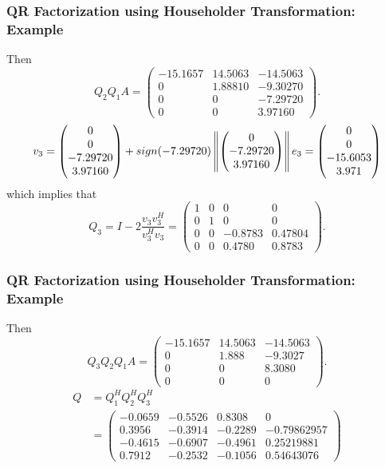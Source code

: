 \documentclass{beamer}
\begin{document}
\begin{frame}\frametitle{QR Factorization using Householder Transformation: Example}
	Then
	\[
		Q_2 Q_1A = 
			\begin{pmatrix}
				-15.1657 & 14.5063 & -14.5063 \\
				0 & 1.88810 & -9.30270 \\
				0 & 0 & -7.29720 \\
				0 & 0 & 3.97160		
			\end{pmatrix}.
	\]
	\[
		v_3 = 
			\begin{pmatrix} 
				0 \\ 0\\-7.29720\\3.97160
			\end{pmatrix} 
			+ sign(-7.29720)
				\left\|
					\begin{pmatrix} 
						0 \\-7.29720\\3.97160
					\end{pmatrix}
				\right\| e_3 
			= \begin{pmatrix} 
				0 \\0 \\ -15.6053 \\3.971
			  \end{pmatrix}
	\]
	which implies that
	\[
		Q_3= I - 2\frac{v_3v_3^H}{v_3^Hv_3}
			= \begin{pmatrix}
				1 & 0 & 0 & 0 \\
				0 & 1 & 0 & 0\\
				0 & 0 & -0.8783 & 0.47804\\
				0 & 0 & 0.4780 & 0.8783 
 			  \end{pmatrix}.
	\]

\end{frame}

\begin{frame}\frametitle{QR Factorization using Householder Transformation: Example}
	Then
	\[
		Q_3 Q_2 Q_1A = 
			\begin{pmatrix}
				-15.1657 & 14.5063 & -14.5063\\
				0 & 1.888 & -9.3027\\
				0 & 0 & 8.3080\\
				0 & 0 & 0
			\end{pmatrix}.
	\]
	\begin{align*}
		Q &= Q_1^H Q_2^H Q_3^H \\
		  &= \begin{pmatrix}
				-0.0659 & -0.5526 & 0.8308 & 0 \\
				0.3956 & -0.3914 & -0.2289 & -0.79862957 \\
				-0.4615 & -0.6907 & -0.4961 & 0.25219881 \\
				0.7912 & -0.2532 & -0.1056 & 0.54643076
 			 \end{pmatrix}
	\end{align*}
\end{frame}
\end{document}
